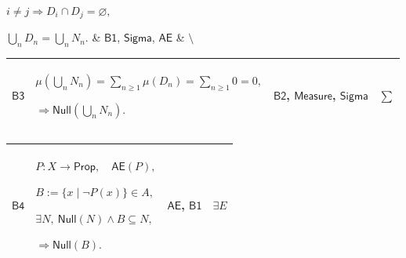 \documentclass[11pt]{amsart}
\newlength{\FTCFourColumnBody}
\begin{document}
{\begin{tabular}
$\displaystyle i\ne j\Rightarrow D_i\cap D_j=\varnothing,$\par
$\displaystyle \bigcup_nD_n=\bigcup_nN_n.$ & \hyperlink{dct:B1}{$\displaystyle \textsf{B1}$}, \hyperlink{ax:Sigma}{$\displaystyle \textsf{Sigma}$}, \hyperlink{dctdef:AE}{$\displaystyle \textsf{AE}$} & $\displaystyle \setminus$\\ \hline
\end{tabular}%
\par\setlength{\parskip}{0pt}\nointerlineskip
\noindent
\begin{tabular}{|@{}>{\centering\arraybackslash}m{0.078431\FTCFourColumnBody}|>{\centering\arraybackslash}m{0.535947\FTCFourColumnBody}|>{\centering\arraybackslash}m{0.281045\FTCFourColumnBody}|>{\centering\arraybackslash}m{0.104575\FTCFourColumnBody}|}\hline
\hypertarget{dct:B3}{$\displaystyle \textsf{B3}$} & $\displaystyle \mu(\bigcup_nN_n)=\sum_{n\ge1}\mu(D_n)=\sum_{n\ge1}0=0,$\par
$\displaystyle \Rightarrow\textsf{Null}(\bigcup_nN_n).$ & \hyperlink{dct:B2}{$\displaystyle \textsf{B2}$}, \hyperlink{ax:Measure}{$\displaystyle \textsf{Measure}$}, \hyperlink{ax:Sigma}{$\displaystyle \textsf{Sigma}$} & $\displaystyle \sum$\\ \hline
\end{tabular}%
\par\setlength{\parskip}{0pt}\nointerlineskip
\noindent
\begin{tabular}{|@{}>{\centering\arraybackslash}m{0.078431\FTCFourColumnBody}|>{\centering\arraybackslash}m{0.535947\FTCFourColumnBody}|>{\centering\arraybackslash}m{0.281045\FTCFourColumnBody}|>{\centering\arraybackslash}m{0.104575\FTCFourColumnBody}|}\hline
\hypertarget{dct:B4}{$\displaystyle \textsf{B4}$} & $\displaystyle P:X\to\textsf{Prop},\quad\textsf{AE}(P),$\par
$\displaystyle B:=\{x\mid\neg P(x)\}\in A,$\par
$\displaystyle \exists N,\ \textsf{Null}(N)\land B\subseteq N,$\par
$\displaystyle \Rightarrow\textsf{Null}(B).$ & \hyperlink{dctdef:AE}{$\displaystyle \textsf{AE}$}, \hyperlink{dct:B1}{$\displaystyle \textsf{B1}$} & $\displaystyle \exists E$\\ \hline
\end{tabular}%
\par
}
\end{document}
